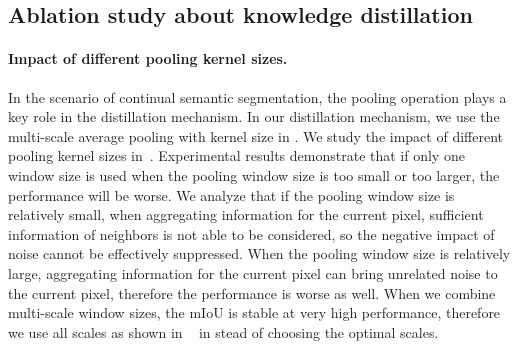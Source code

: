 \documentclass[10pt,twocolumn,letterpaper]{article}
\begin{document}
\subsection{Ablation study about knowledge distillation}
\paragraph{Impact of different pooling kernel sizes.}
In the scenario of continual semantic segmentation,
the pooling operation plays a key role in the distillation mechanism.
In our distillation mechanism,
we use the multi-scale average pooling with kernel size in .
We study the impact of different pooling kernel sizes in~.
Experimental results demonstrate that if only one window size is used when the pooling window size is too small or too larger,
the performance will be worse.
We analyze that if the pooling window size is relatively small, when aggregating information for the current pixel, sufficient information of neighbors is not able to be  considered, so the negative impact of noise cannot be effectively suppressed.
When the pooling window size is relatively large, aggregating information for the current pixel can bring unrelated noise to the current pixel, therefore the performance is worse as well. When we combine multi-scale window sizes, the mIoU is stable at very high performance, therefore we use all scales as shown in ~ in stead of choosing the optimal scales. 
\end{document}
